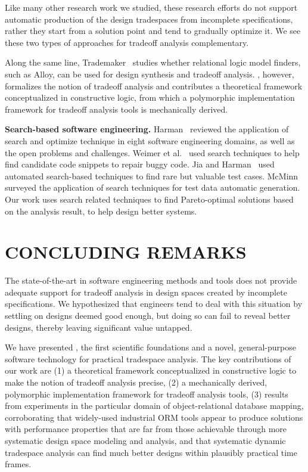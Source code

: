 \documentclass[10pt,conference]{IEEEtran}
\begin{document}
Like many other research work we studied, these research efforts do not support automatic production of the design tradespaces from incomplete specifications, rather they start from a solution point and tend to gradually optimize it. We see these two types of approaches for tradeoff analysis complementary.

Along the same line, Trademaker~\cite{trademaker} studies whether relational logic model finders, such as Alloy, can be used for design synthesis and tradeoff analysis.  \@approach, however, formalizes the notion of tradeoff analysis and contributes a theoretical framework conceptualized in constructive logic, from which a  polymorphic implementation framework for tradeoff analysis tools is mechanically derived. 


\textbf{Search-based software engineering.} Harman~\cite{harman_search_future} reviewed the application of search and optimize technique in eight software engineering domains, as well as the open problems and challenges. Weimer et al.~\cite{weimer_genetic_repaire} used search techniques to help find candidate code snippets to repair buggy code. Jia and Harman~\cite{jia_higherorder_test} used automated search-based techniques to find rare but valuable test cases. McMinn~\cite{MacMinn_test_generation} surveyed the application of search techniques for test data automatic generation. Our work uses search related techniques to find Pareto-optimal solutions based on the analysis result, to help design better systems.



\section{CONCLUDING REMARKS}
The state-of-the-art in software engineering methods and tools does not provide adequate support for tradeoff analysis in design spaces created by incomplete specifications. We hypothesized that engineers tend to deal with this situation by settling on designs deemed good enough, but doing so can fail to reveal better designs, thereby leaving significant value untapped. 

We have presented \@approach, the first scientific foundations and a novel, general-purpose software technology for practical tradespace analysis. The key contributions of our work are (1) a theoretical framework conceptualized in constructive logic to make the notion of tradeoff analysis precise, (2) a mechanically derived, polymorphic implementation framework for tradeoff analysis tools, (3) results from experiments in the particular domain of object-relational database mapping, corroborating that widely-used industrial ORM tools appear to produce solutions with performance properties that are far from those achievable through more systematic design space modeling and analysis, and that systematic dynamic tradespace analysis can find much better designs within plausibly practical time frames. 
 
\end{document}
